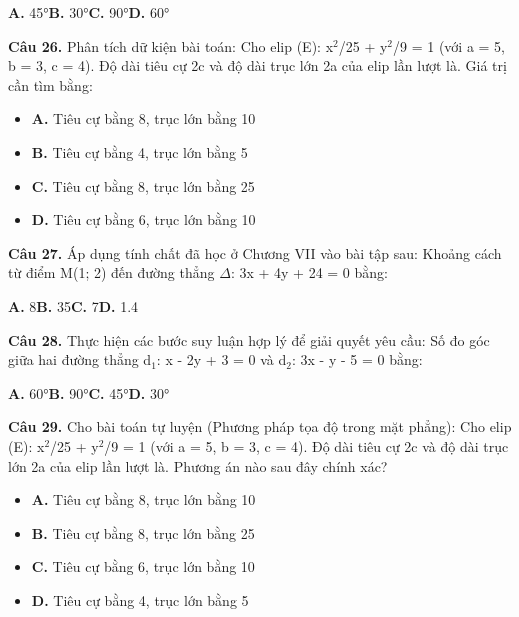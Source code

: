 \documentclass[11pt,a4paper]{article}
\begin{document}
\hspace*{1.5em}\textbf{A.} 45°\quad\quad \textbf{B.} 30°\quad\quad \textbf{C.} 90°\quad\quad \textbf{D.} 60°\par\vspace{2pt}
\textbf{\color{primary} Câu 26.} Phân tích dữ kiện bài toán: Cho elip (E): x$^2$/25 + y$^2$/9 = 1 (với a = 5, b = 3, c = 4). Độ dài tiêu cự 2c và độ dài trục lớn 2a của elip lần lượt là. Giá trị cần tìm bằng:\par
\begin{itemize}\setlength{\itemsep}{1pt}\setlength{\parskip}{0pt}
  \item[] \textbf{A.} Tiêu cự bằng 8, trục lớn bằng 10
  \item[] \textbf{B.} Tiêu cự bằng 4, trục lớn bằng 5
  \item[] \textbf{C.} Tiêu cự bằng 8, trục lớn bằng 25
  \item[] \textbf{D.} Tiêu cự bằng 6, trục lớn bằng 10
\end{itemize}\vspace{2pt}
\textbf{\color{primary} Câu 27.} Áp dụng tính chất đã học ở Chương VII vào bài tập sau: Khoảng cách từ điểm M(1; 2) đến đường thẳng $\Delta$: 3x + 4y + 24 = 0 bằng:\par
\hspace*{1.5em}\textbf{A.} 8\quad\quad \textbf{B.} 35\quad\quad \textbf{C.} 7\quad\quad \textbf{D.} 1.4\par\vspace{2pt}
\textbf{\color{primary} Câu 28.} Thực hiện các bước suy luận hợp lý để giải quyết yêu cầu: Số đo góc giữa hai đường thẳng d$_1$: x - 2y + 3 = 0 và d$_2$: 3x - y - 5 = 0 bằng:\par
\hspace*{1.5em}\textbf{A.} 60°\quad\quad \textbf{B.} 90°\quad\quad \textbf{C.} 45°\quad\quad \textbf{D.} 30°\par\vspace{2pt}
\textbf{\color{primary} Câu 29.} Cho bài toán tự luyện (Phương pháp tọa độ trong mặt phẳng): Cho elip (E): x$^2$/25 + y$^2$/9 = 1 (với a = 5, b = 3, c = 4). Độ dài tiêu cự 2c và độ dài trục lớn 2a của elip lần lượt là. Phương án nào sau đây chính xác?\par
\begin{itemize}\setlength{\itemsep}{1pt}\setlength{\parskip}{0pt}
  \item[] \textbf{A.} Tiêu cự bằng 8, trục lớn bằng 10
  \item[] \textbf{B.} Tiêu cự bằng 8, trục lớn bằng 25
  \item[] \textbf{C.} Tiêu cự bằng 6, trục lớn bằng 10
  \item[] \textbf{D.} Tiêu cự bằng 4, trục lớn bằng 5
\end{itemize}\vspace{2pt}
\end{document}
